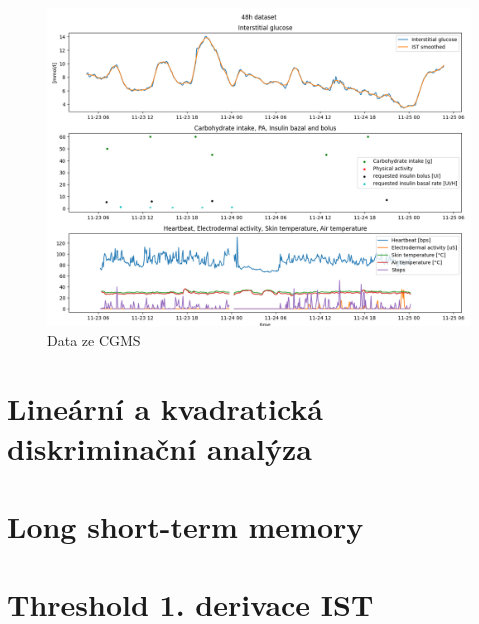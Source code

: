 \begin{figure}[H]
\caption{Data ze CGMS}
\label{tab:48h_dataset}
\centering
\includegraphics[width=1\textwidth]{img/cho/48h_dataset.png}
\end{figure}



\section{Lineární a kvadratická diskriminační analýza}
\label{ch:lda_qda}




\section{Long short-term memory}
\label{ch:lstm}


\section{Threshold 1. derivace IST}
\label{ch:threshold}
